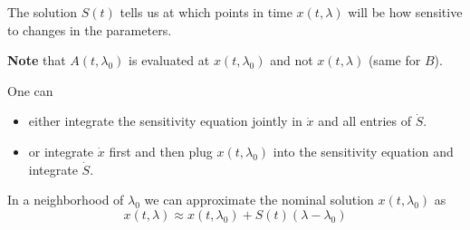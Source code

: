 The solution $S(t)$ tells us at which points in time $x(t,\lambda)$ will be how sensitive to changes in the parameters.

\textbf{Note} that $A (t, \lambda_0)$ is evaluated at $x(t, \lambda_0)$ and not $x(t, \lambda)$ (same for $B$).

\newpar{}

One can
\begin{itemize}
    \item either integrate the sensitivity equation jointly in $\dot{x}$ and all entries of $\dot{S}$.
    \item or integrate $\dot{x}$ first and then plug $x(t, \lambda_0)$ into the sensitivity equation and integrate $\dot{S}$.
\end{itemize}

\newpar{}

In a neighborhood of $\lambda_0$ we can approximate the nominal solution $x(t, \lambda_0)$ as
\noindent\begin{equation*}
    x\left(t,\lambda\right)\approx x\left(t,\lambda_0\right)+S\left(t\right)\left(\lambda-\lambda_0\right)
\end{equation*}

